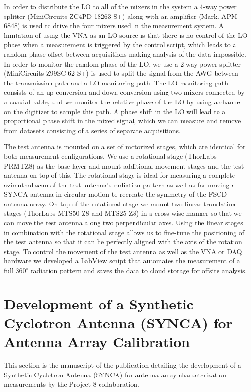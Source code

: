In order to distribute the LO to all of the mixers in the system a 4-way power splitter (MiniCircuits ZC4PD-18263-S+) along with an amplifier (Marki APM-6848) is used to drive the four mixers used in the measurement system. A limitation of using the VNA as an LO source is that there is no control of the LO phase when a measurement is triggered by the control script, which leads to a random phase offset between acquisitions making analysis of the data impossible. In order to monitor the random phase of the LO, we use a 2-way power splitter (MiniCircuits Z99SC-62-S+) is used to split the signal from the AWG between the transmission path and a LO monitoring path. The LO monitoring path consists of an up-conversion and down conversion using two mixers connected by a coaxial cable, and we monitor the relative phase of the LO by using a channel on the digitizer to sample this path. A phase shift in the LO will lead to a proportional phase shift in the mixed signal, which we can measure and remove from datasets consisting of a series of separate acquisitions.

The test antenna is mounted on a set of motorized stages, which are identical for both measurement configurations. We use a rotational stage (ThorLabs PRMTZ8) as the base layer and mount additional movement stages and the test antenna on top of this. The rotational stage is ideal for measuring a complete azimuthal scan of the test antenna's radiation pattern as well as for moving a SYNCA antenna in circular motion to recreate the symmetry of the FSCD antenna array. On top of the rotational stage we mount two linear translation stages (ThorLabs MTS50-Z8 and MTS25-Z8) in a cross-wise manner so that we can move the test antenna along two perpendicular axes. Using the linear stages in combination with the rotational stage allows us to fine-tune the positioning of the test antenna so that it can be perfectly aligned with the axis of the rotation stage. To control the movement of the test antenna as well as the VNA or DAQ hardware we developed a LabView script that automates the measurement of a full $360^\circ$ radiation pattern and saves the data to cloud storage for offsite analysis.

\section{Development of a Synthetic Cyclotron Antenna (SYNCA) for Antenna Array Calibration}
\label{sec:SYNCA}
This section is the manuscript of the publication \cite{p8synca} detailing the development of a Synthetic Cyclotron Antenna (SYNCA) for antenna array characterization measurements by the Project 8 collaboration. 


